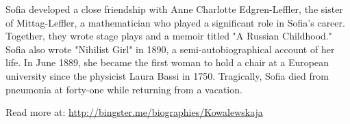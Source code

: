 \documentclass[12pt,a4paper]{article}
\begin{document}
Sofia developed a close friendship with Anne Charlotte Edgren-Leffler, the sister of Mittag-Leffler, a mathematician who played a significant role in Sofia's career. Together, they wrote stage plays and a memoir titled "A Russian Childhood." Sofia also wrote "Nihilist Girl" in 1890, a semi-autobiographical account of her life. In June 1889, she became the first woman to hold a chair at a European university since the physicist Laura Bassi in 1750. Tragically, Sofia died from pneumonia at forty-one while returning from a vacation.

Read more at: \url{http://bingster.me/biographies/Kowalewskaja}\\





%
%
\end{document}
